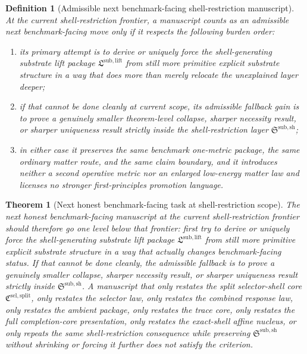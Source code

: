 \documentclass[11pt]{article}
\newcommand{\SelectorCore}{\mathfrak C^{\mathrm{sel,split}}}
\newcommand{\ShellRestriction}{\mathfrak S^{\mathrm{sub,sh}}}
\newcommand{\LiftPackage}{\mathfrak L^{\mathrm{sub,lift}}}
\newtheorem{definition}{Definition}
\newtheorem{theorem}{Theorem}
\begin{document}
\begin{definition}[Admissible next benchmark-facing shell-restriction manuscript]
At the current shell-restriction frontier, a manuscript counts as an admissible next benchmark-facing move only if it respects the following burden order:
\begin{enumerate}
    \item its primary attempt is to derive or uniquely force the shell-generating substrate lift package \(\LiftPackage\) from still more primitive explicit substrate structure in a way that does more than merely relocate the unexplained layer deeper;
    \item if that cannot be done cleanly at current scope, its admissible fallback gain is to prove a genuinely smaller theorem-level collapse, sharper necessity result, or sharper uniqueness result strictly inside the shell-restriction layer \(\ShellRestriction\);
    \item in either case it preserves the same benchmark one-metric package, the same ordinary matter route, and the same claim boundary, and it introduces neither a second operative metric nor an enlarged low-energy matter law and licenses no stronger first-principles promotion language.
\end{enumerate}
\end{definition}

\begin{theorem}[Next honest benchmark-facing task at shell-restriction scope]
The next honest benchmark-facing manuscript at the current shell-restriction frontier should therefore go one level below that frontier: first try to derive or uniquely force the shell-generating substrate lift package \(\LiftPackage\) from still more primitive explicit substrate structure in a way that actually changes benchmark-facing status. If that cannot be done cleanly, the admissible fallback is to prove a genuinely smaller collapse, sharper necessity result, or sharper uniqueness result strictly inside \(\ShellRestriction\). A manuscript that only restates the split selector-shell core \(\SelectorCore\), only restates the selector law, only restates the combined response law, only restates the ambient package, only restates the trace core, only restates the full completion-core presentation, only restates the exact-shell affine nucleus, or only repeats the same shell-restriction consequence while preserving \(\ShellRestriction\) without shrinking or forcing it further does not satisfy the criterion.
\end{theorem}
\end{document}
